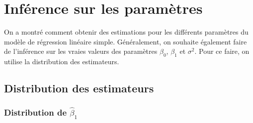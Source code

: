 \section{Inférence sur les paramètres}
\label{sec:InférenceParamètres}

On a montré comment obtenir des estimations pour les différents paramètres du modèle de régression linéaire simple. Généralement, on souhaite également faire de l'inférence sur les vraies valeurs des paramètres $\beta_0$, $\beta_1$ et $\sigma^2$. Pour ce faire, on utilise la distribution des estimateurs.

\subsection{Distribution des estimateurs}
\label{sec:LoisBetas}

\subsubsection{Distribution de $\widehat{\beta}_1$}
\label{sec:LoiDeHatBeta1}

